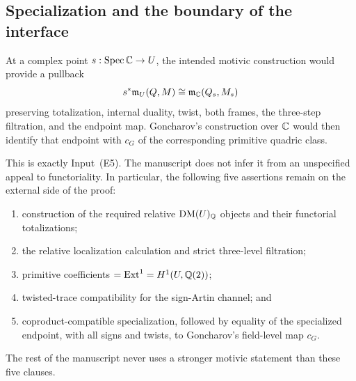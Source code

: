 \subsection{Specialization and the boundary of the interface}

At a complex point \(s:\operatorname{Spec}\mathbb C\to U\), the intended motivic construction
would provide a pullback
\[
 s^*\mathfrak m_U(Q,M)\cong\mathfrak m_\mathbb C(Q_s,M_s)
\]
preserving totalization, internal duality, twist, both frames, the
three-step filtration, and the endpoint map.  Goncharov's construction over
\(\mathbb C\) would then identify that endpoint with \(c_G\) of the corresponding
primitive quadric class.

This is exactly Input~\textup{(E5)}.  The manuscript does not infer it from
an unspecified appeal to functoriality.  In particular, the following five
assertions remain on the external side of the proof:
\begin{enumerate}[label=(\roman*),leftmargin=2.4em]
\item construction of the required relative \(\operatorname{DM}(U)_\mathbb Q\) objects and
      their functorial totalizations;
\item the relative localization calculation and strict three-level
      filtration;
\item primitive coefficients \(=\operatorname{Ext}^1=H^1(U,\mathbb Q(2))\);
\item twisted-trace compatibility for the sign-Artin channel; and
\item coproduct-compatible specialization, followed by equality of the
      specialized endpoint, with all signs and twists, to
      Goncharov's field-level map \(c_G\).
\end{enumerate}

The rest of the manuscript never uses a stronger motivic statement than
these five clauses.

